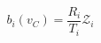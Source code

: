 \documentclass[12pt]{article}
\begin{document}
\begin{equation}
    \nonumber b_i(v_C) = \frac{R_i}{T_i} \mathcal{Z}_i
\end{equation}
\end{document}
